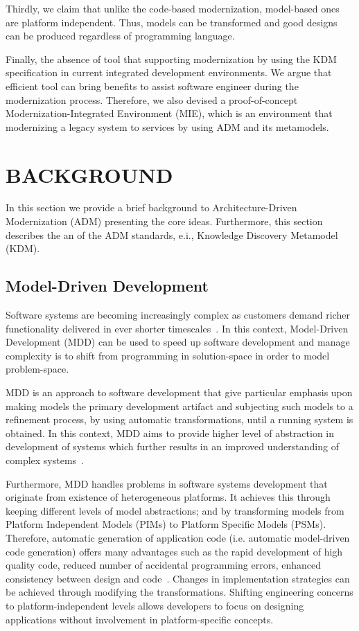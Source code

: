 \documentclass[a4paper,twoside]{article}
\begin{document}
Thirdly, we claim that unlike the code-based modernization, model-based ones are platform independent. Thus, models can be transformed and good designs can be produced regardless of programming language. 

Finally, the absence of tool that supporting modernization by using the KDM specification in current integrated development environments. We argue that efficient tool can bring benefits to assist software engineer during the modernization process. Therefore, we also devised a proof-of-concept Modernization-Integrated Environment (MIE), which is an environment that modernizing a legacy system to services by using ADM and its metamodels.

\section{\uppercase{Background}}

\noindent In this section we provide a brief background to Architecture-Driven Modernization (ADM) presenting the core ideas. Furthermore, this section describes the an of the ADM standards, e.i., Knowledge Discovery Metamodel (KDM).

\subsection{Model-Driven Development}

Software systems are becoming increasingly complex as customers demand richer functionality delivered in ever shorter timescales~\cite{550}. 
In this context, Model-Driven Development (MDD) can be used to speed up software development and manage complexity is to shift from programming in solution-space in order to model problem-space.

MDD is an approach to software development that give particular emphasis upon making models the primary development artifact and subjecting such models to a refinement process, by using automatic transformations, until a running system is obtained. In this context, MDD aims to provide higher level of abstraction in development of systems which further results in an improved understanding of complex systems~\cite{1296153}. 

Furthermore, MDD handles problems in software systems development that originate from existence of heterogeneous platforms. It achieves this through keeping different levels of model abstractions; and by transforming models from Platform Independent Models (PIMs) to Platform Specific Models (PSMs). Therefore, automatic  generation of application code (i.e. automatic model-driven code generation) offers many advantages such as the rapid development of high quality code, reduced number of accidental programming errors, enhanced consistency between design and code~\cite{Schmidt06_ModelDrivenEngineering}. Changes in implementation strategies can be achieved through modifying the transformations. Shifting engineering concerns to platform-independent levels allows developers to focus on designing applications without involvement in platform-specific concepts.
\end{document}
